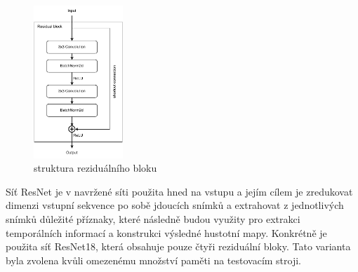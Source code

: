 \begin{figure}[h!]
	\centering
	\includegraphics[width=0.3\textwidth]{Figures/solution/residual_block.pdf}
	\caption{struktura reziduálního bloku}
	\label{fig:residual_block}
\end{figure}

Síť ResNet je v navržené síti použita hned na vstupu a jejím cílem je zredukovat dimenzi vstupní sekvence po sobě jdoucích snímků a extrahovat z jednotlivých snímků důležité příznaky, které následně budou využity pro extrakci temporálních informací a konstrukci výsledné hustotní mapy.
Konkrétně je použita síť ResNet18, která obsahuje pouze čtyři reziduální bloky.
Tato varianta byla zvolena kvůli omezenému množství paměti na testovacím stroji.


\endinput